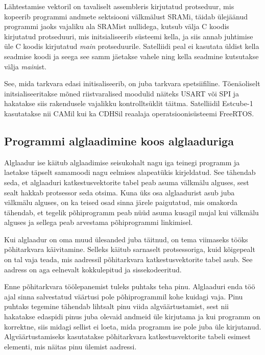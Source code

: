 \documentclass[12pt,a4paper]{article}
\begin{document}
Lähtestamise vektoril on tavaliselt assembleris kirjutatud protseduur, mis
kopeerib programmi andmete sektsiooni välkmälust SRAMi, täidab ülejäänud
programmi jaoks vajaliku ala SRAMist nullidega, kutsub välja C koodis kirjutatud
protseduuri, mis initsialiseerib süsteemi kella, ja siis annab juhtimise üle C
koodis kirjutatud \textit{main} protseduurile. Satelliidi peal ei kasutata
üldist kella seadmise koodi ja seega see samm jäetakse vahele ning kella
seadmine kutsutakse välja \textit{main}ist.

See, mida tarkvara edasi initisaliseerib, on juba tarkvara spetsiifiline.
Tõenäoliselt initsialiseeritakse mõned riistvaralised moodulid näiteks USART või
SPI ja hakatakse siis rakendusele vajalikku kontrolltsüklit täitma. Satelliidil
Estcube-1 kasutatakse nii CAMil kui ka CDHSil reaalaja operatsioonisüsteemi
FreeRTOS.

\subsection{Programmi alglaadimine koos alglaaduriga}
Alglaadur ise käitub alglaadimise seisukohalt nagu iga teinegi programm ja
laetakse täpselt samamoodi nagu eelmises alapeatükis kirjeldatud. See tähendab
seda, et alglaaduri katkestusvektorite tabel peab asuma välkmälu alguses, sest
sealt hakkab protsessor seda otsima. Kuna üks osa alglaadurist asub juba
välkmälu alguses, on ka teised osad sinna järele paigutatud, mis omakorda
tähendab, et tegelik põhiprogramm peab nüüd asuma kusagil mujal kui välkmälu
alguses ja sellega peab arvestama põhiprogrammi linkimisel.

Kui alglaadur on oma muud ülesanded juba täitnud, on tema viimaseks tööks
põhitarkvara käivitamine. Selleks käitub sarnaselt protsessoriga, kuid
kõigepealt on tal vaja teada, mis aadressil põhitarkvara katkestusvektorite
tabel asub. See aadress on aga eelnevalt kokkulepitud ja sissekodeeritud.

Enne põhitarkvara töölepanemist tuleks puhtaks teha pinu. Alglaaduri enda töö
ajal sinna salvestatud väärtusi pole põhiprogrammil kohe kuidagi vaja. Pinu
puhtaks tegemine tähendab lihtsalt pinu viida algväärtustamist, sest nii
hakatakse edaspidi pinus juba olevaid andmeid üle kirjutama ja kui programm on
korrektne, siis midagi sellist ei loeta, mida programm ise pole juba üle
kirjutanud. Algväärtustamiseks kasutatakse põhitarkvara katkestusvektorite
tabeli esimest elementi, mis näitas pinu ülemist aadressi.
\end{document}
